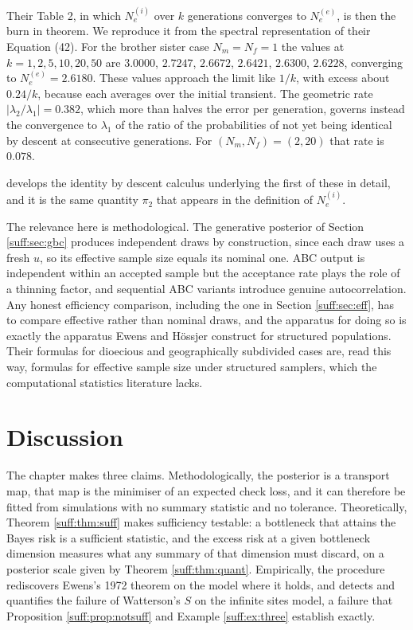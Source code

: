 Their Table 2, in which $N_e^{(i)}$ over $k$ generations converges to $N_e^{(e)}$, is then the burn in theorem. We reproduce it from the spectral representation of their Equation (42). For the brother sister case $N_m=N_f=1$ the values at $k=1,2,5,10,20,50$ are $3.0000$, $2.7247$, $2.6672$, $2.6421$, $2.6300$, $2.6228$, converging to $N_e^{(e)}=2.6180$. These values approach the limit like $1/k$, with excess about $0.24/k$, because each averages over the initial transient. The geometric rate $|\lambda_2/\lambda_1|=0.382$, which more than halves the error per generation, governs instead the convergence to $\lambda_1$ of the ratio of the probabilities of not yet being identical by descent at consecutive generations. For $(N_m,N_f)=(2,20)$ that rate is $0.078$.

\citet{suff:thompson2013} develops the identity by descent calculus underlying the first of
these in detail, and it is the same quantity $\pi_2$ that appears in the definition of
$N_e^{(i)}$.

The relevance here is methodological. The generative posterior of Section \ref{suff:sec:gbc}
produces independent draws by construction, since each draw uses a fresh $u$, so its
effective sample size equals its nominal one. ABC output is independent within an accepted
sample but the acceptance rate plays the role of a thinning factor, and sequential ABC
variants introduce genuine autocorrelation. Any honest efficiency comparison, including the
one in Section \ref{suff:sec:eff}, has to compare effective rather than nominal draws, and the
apparatus for doing so is exactly the apparatus Ewens and H\"ossjer construct for structured
populations. Their formulas for dioecious and geographically subdivided cases are, read this
way, formulas for effective sample size under structured samplers, which the computational
statistics literature lacks.

\section{Discussion}

The chapter makes three claims. Methodologically, the posterior is a transport map, that map is the minimiser of
an expected check loss, and it can therefore be fitted from simulations with no summary
statistic and no tolerance. Theoretically, Theorem \ref{suff:thm:suff} makes sufficiency
testable: a bottleneck that attains the Bayes risk is a sufficient statistic, and the excess
risk at a given bottleneck dimension measures what any summary of that dimension must
discard, on a posterior scale given by Theorem \ref{suff:thm:quant}. Empirically, the
procedure rediscovers Ewens's 1972 theorem on the model where it holds, and detects and
quantifies the failure of Watterson's $S$ on the infinite sites model, a failure that
Proposition \ref{suff:prop:notsuff} and Example \ref{suff:ex:three} establish exactly.

